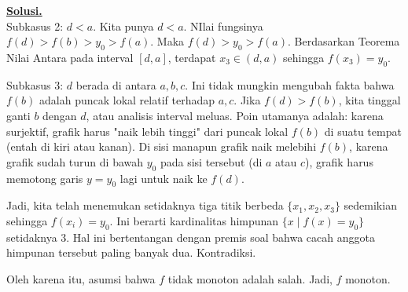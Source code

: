 \documentclass[12pt,twoside]{article}
\newenvironment{solution}
{
	\par\noindent\textbf{\underline{Solusi.}}\\
}
{
	\par
}
\begin{document}
\begin{enumerate}
\begin{solution}
          Subkasus 2: $d < a$.
          Kita punya $d < a$. NIlai fungsinya $f(d) > f(b) > y_0 > f(a)$.
          Maka $f(d) > y_0 > f(a)$.
          Berdasarkan Teorema Nilai Antara pada interval $[d, a]$, terdapat $x_3 \in (d, a)$ sehingga $f(x_3) = y_0$.

          Subkasus 3: $d$ berada di antara $a, b, c$.
          Ini tidak mungkin mengubah fakta bahwa $f(b)$ adalah puncak lokal relatif terhadap $a, c$. Jika $f(d) > f(b)$, kita tinggal ganti $b$ dengan $d$, atau analisis interval meluas.
          Poin utamanya adalah: karena surjektif, grafik harus "naik lebih tinggi" dari puncak lokal $f(b)$ di suatu tempat (entah di kiri atau kanan).
          Di sisi manapun grafik naik melebihi $f(b)$, karena grafik sudah turun di bawah $y_0$ pada sisi tersebut (di $a$ atau $c$), grafik harus memotong garis $y=y_0$ lagi untuk naik ke $f(d)$.

          Jadi, kita telah menemukan setidaknya tiga titik berbeda $\{x_1, x_2, x_3\}$ sedemikian sehingga $f(x_i) = y_0$.
          Ini berarti kardinalitas himpunan $\{x \mid f(x) = y_0\}$ setidaknya 3.
          Hal ini bertentangan dengan premis soal bahwa cacah anggota himpunan tersebut paling banyak dua.
          Kontradiksi.

          Oleh karena itu, asumsi bahwa $f$ tidak monoton adalah salah.
          Jadi, $f$ monoton.
        \end{solution}



\end{enumerate}
\end{document}
